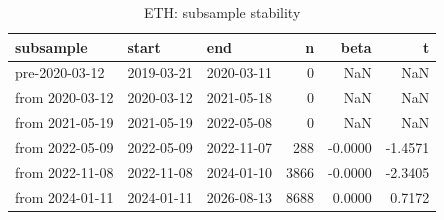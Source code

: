 \begin{table}
\caption{ETH: subsample stability}
\label{tab:t9_subsamples_ETH}
\begin{tabular}{lllrrr}
\toprule
subsample & start & end & n & beta & t \\
\midrule
pre-2020-03-12 & 2019-03-21 & 2020-03-11 & 0 & NaN & NaN \\
from 2020-03-12 & 2020-03-12 & 2021-05-18 & 0 & NaN & NaN \\
from 2021-05-19 & 2021-05-19 & 2022-05-08 & 0 & NaN & NaN \\
from 2022-05-09 & 2022-05-09 & 2022-11-07 & 288 & -0.0000 & -1.4571 \\
from 2022-11-08 & 2022-11-08 & 2024-01-10 & 3866 & -0.0000 & -2.3405 \\
from 2024-01-11 & 2024-01-11 & 2026-08-13 & 8688 & 0.0000 & 0.7172 \\
\bottomrule
\end{tabular}
\end{table}
